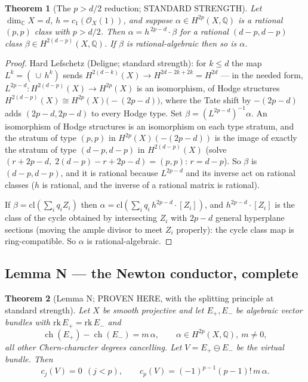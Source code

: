 \documentclass[11pt]{article}
\newtheorem{theorem}{Theorem}
\newcommand{\Oo}{\mathcal O}
\newcommand{\ch}{\operatorname{ch}}
\newcommand{\C}{\mathbb C}
\newcommand{\Q}{\mathbb Q}
\begin{document}
\begin{theorem}[The $p>d/2$ reduction; STANDARD STRENGTH]
Let $\dim_\C X=d$, $h=c_1(\Oo_X(1))$, and suppose
$\alpha\in H^{2p}(X,\Q)$ is a rational $(p,p)$ class with $p>d/2$.
Then $\alpha=h^{\,2p-d}\cdot\beta$ for a rational
$(d-p,d-p)$ class $\beta\in H^{2(d-p)}(X,\Q)$. If $\beta$ is
rational-algebraic then so is $\alpha$.
\end{theorem}

\begin{proof}
Hard Lefschetz (Deligne; standard strength): for $k\le d$ the map
$L^k=(\,\cup\, h^k)$ sends $H^{2(d-k)}(X)\to H^{2d-2k+2k}=H^{2d}$
--- in the needed form, $L^{2p-d}\colon H^{2(d-p)}(X)\to H^{2p}(X)$ is
an isomorphism, of Hodge structures
$H^{2(d-p)}(X)\cong H^{2p}(X)\big(-(2p-d)\big)$, where the Tate shift
by $-(2p-d)$ adds $(2p-d,2p-d)$ to every Hodge type. Set
$\beta=(L^{2p-d})^{-1}\alpha$. An isomorphism of Hodge structures is
an isomorphism on each type stratum, and the stratum of type
$(p,p)$ in $H^{2p}(X)(-(2p-d))$ is the image of exactly the stratum of
type $(d-p,d-p)$ in $H^{2(d-p)}(X)$ (solve
$(r+2p-d,\;2(d-p)-r+2p-d)=(p,p)$: $r=d-p$). So $\beta$ is
$(d-p,d-p)$, and it is rational because $L^{2p-d}$ and its inverse act
on rational classes ($h$ is rational, and the inverse of a rational
matrix is rational).

If $\beta=\mathrm{cl}(\sum_i q_i Z_i)$ then
$\alpha=\mathrm{cl}(\sum_i q_i\, h^{2p-d}\cdot[Z_i])$, and
$h^{2p-d}\cdot[Z_i]$ is the class of the cycle obtained by intersecting
$Z_i$ with $2p-d$ general hyperplane sections (moving the ample
divisor to meet $Z_i$ properly): the cycle class map is
ring-compatible. So $\alpha$ is rational-algebraic.
\end{proof}

\subsection{Lemma N --- the Newton conductor, complete}

\begin{theorem}[Lemma N; PROVEN HERE, with the splitting principle at
standard strength]
Let $X$ be smooth projective and let $E_+,E_-$ be algebraic vector
bundles with $\mathrm{rk}\,E_+=\mathrm{rk}\,E_-$ and
\[
\ch(E_+)-\ch(E_-)=m\,\alpha,\qquad
\alpha\in H^{2p}(X,\Q),\ m\ne0,
\]
all other Chern-character degrees cancelling. Let
$V=E_+\ominus E_-$ be the virtual bundle. Then
\[
c_j(V)=0\ \ (j<p),\qquad
c_p(V)=(-1)^{p-1}(p-1)!\,m\,\alpha .
\]
\end{theorem}
\end{document}
